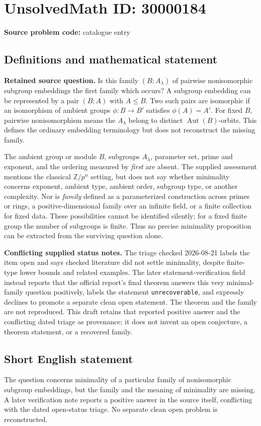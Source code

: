 \documentclass[11pt]{article}
\newcommand{\Z}{\mathbb{Z}}
\begin{document}
\section*{UnsolvedMath ID: 30000184}
\textbf{Source problem code:} catalogue entry
\subsection{Definitions and mathematical statement}
\textbf{Retained source question.} Is this family \((B;A_\lambda)\) of pairwise nonisomorphic subgroup embeddings the first family which occurs? A subgroup embedding can be represented by a pair \((B;A)\) with \(A\le B\). Two such pairs are isomorphic if an isomorphism of ambient groups \(\phi:B\to B'\) satisfies \(\phi(A)=A'\). For fixed \(B\), pairwise nonisomorphism means the \(A_\lambda\) belong to distinct \(\operatorname{Aut}(B)\)-orbits. This defines the ordinary embedding terminology but does not reconstruct the missing family.\par The ambient group or module \(B\), subgroups \(A_\lambda\), parameter set, prime and exponent, and the ordering measured by \emph{first} are absent. The supplied assessment mentions the classical \(\Z/p^n\) setting, but does not say whether minimality concerns exponent, ambient type, ambient order, subgroup type, or another complexity. Nor is \emph{family} defined as a parameterized construction across primes or rings, a positive-dimensional family over an infinite field, or a finite collection for fixed data. These possibilities cannot be identified silently; for a fixed finite group the number of subgroups is finite. Thus no precise minimality proposition can be extracted from the surviving question alone.\par \textbf{Conflicting supplied status notes.} The triage checked 2026-08-21 labels the item open and says checked literature did not settle minimality, despite finite-type lower bounds and related examples. The later statement-verification field instead reports that the official report's final theorem answers this very minimal-family question positively, labels the statement \texttt{unrecoverable}, and expressly declines to promote a separate clean open statement. The theorem and the family are not reproduced. This draft retains that reported positive answer and the conflicting dated triage as provenance; it does not invent an open conjecture, a theorem statement, or a recovered family.
\subsection{Short English statement}
The question concerns minimality of a particular family of nonisomorphic subgroup embeddings, but the family and the meaning of minimality are missing. A later verification note reports a positive answer in the source itself, conflicting with the dated open-status triage. No separate clean open problem is reconstructed.
\end{document}
